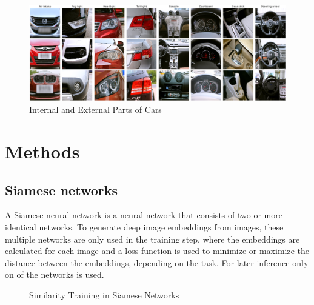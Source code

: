 \documentclass[12pt,a4paper]{report}
\begin{document}
\begin{figure}[h]
    \centering
    \includegraphics[width=\textwidth]{./images/carparst.png}
	\caption{Internal and External Parts of Cars}
\end{figure}


\newpage


\chapter{Methods}
\section{Siamese networks}
A Siamese neural network is a neural network that consists of two or more identical networks.\cite{signatureVerification}
To generate deep image embeddings from images, these multiple networks are only used in the training step,
where the embeddings are calculated for each image and a loss function is used to minimize or maximize the distance between the embeddings,
depending on the task. For later inference only on of the networks is used.

\begin{figure}[h]
    \centering
    \qquad
    \caption{Similarity Training in Siamese Networks \cite{simclrartikle}}
\end{figure}
\end{document}
